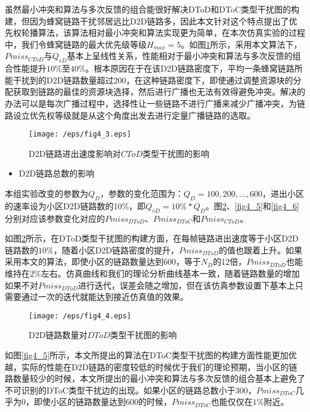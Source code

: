 \documentclass[figurelist,tablelist,algorithmlist,nomlist,masters]{seuthesix}
\begin{document}
	
	虽然最小冲突和算法与多次反馈的组合能很好解决DToD和DToC类型干扰图的构建，但因为蜂窝链路干扰邻居远比D2D链路多，因此本文针对这个特点提出了优先权轮播算法，该算法相对最小冲突和算法实现更为简单，在本次仿真实验的过程中，我们令蜂窝链路的最大优先级等级$H_{max} = 5$。如图\ref{fig4_3}所示，采用本文算法下，$Pmiss_{CToD}$与$Q_{vD}$基本上呈线性关系，性能相对于最小冲突和算法与多次反馈的组合性能提升$10\%$至$40\%$。根本原因在于在该D2D链路密度下，平均一条蜂窝链路所能干扰到的D2D链路数量超过200，在这种链路密度下，即使通过调整资源块的分配获取到链路的最佳的资源块选择，然后进行广播也无法有效得避免冲突。解决的办法可以是每次广播过程中，选择性让一些链路不进行广播来减少广播冲突，为链路设立优先权等级就是从这个角度出发去进行定量广播链路的选取。
	
	\begin{figure}[!h]
		\centering
		\texttt{[image: /eps/fig4\_3.eps]}
		\caption{D2D链路进出速度影响对$CToD$类型干扰图的影响}
		\label{fig4_3}
	\end{figure}
	
	\begin{itemize}
		\item D2D链路总数的影响
	\end{itemize}
	
	本组实验改变的参数为$Q_{D}$，参数的变化范围为：$Q_{D} = 100,200,...,600$，进出小区的速率设为小区D2D链路数的10\%，即$Q_{vD} = 10\% * Q_{D}$。图\ref{fig4_4}、\ref{fig4_5}和\ref{fig4_6}分别对应该参数变化对应的$Pmiss_{DToD}$、$Pmiss_{DToC}$和$Pmiss_{CToD}$。
	
	如图\ref{fig4_4}所示，在DToD类型干扰图的构建方面，在每帧链路进出速度等于小区D2D链路数的$10\%$，随着小区D2D链路密度的提升，$Pmiss_{DToD}$的值也跟着上升。如果采用本文的算法，即使小区的链路数量达到$600$，等于$N_{D}$的12倍，$Pmiss_{DToD}$也能维持在$2\%$左右。仿真曲线和我们的理论分析曲线基本一致，随着链路数量的增加如果不对$Pmiss_{DToD}$进行迭代，误差会随之增加，但在该仿真参数设置下基本上只需要通过一次的迭代就能达到接近仿真值的效果。
	
	\begin{figure}[!h]
		\centering
		\texttt{[image: /eps/fig4\_4.eps]}
		\caption{D2D链路数量对$DToD$类型干扰图的影响}
		\label{fig4_4}
	\end{figure}
	
	
	如图\ref{fig4_5}所示，本文所提出的算法在DToC类型干扰图的构建方面性能更加优越，实际的性能在D2D链路的密度较低的时候优于我们的理论预期，当小区的链路数量较少的时候，本文所提出的最小冲突和算法与多次反馈的组合基本上避免了不可识别的DToC类型干扰边的出现。如果小区的链路总数小于$300$，$Pmiss_{DToC}$几乎为0，即使小区的链路数量达到$600$的时候，$Pmiss_{DToC}$也能仅仅在$1\%$附近。
	
\end{document}
